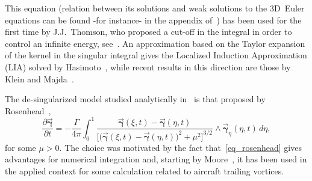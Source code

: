 \documentclass[a4paper,11pt]{article}
\numberwithin{equation}{section}
\newcommand{\bgamma}{\mbox{$\vec{\boldsymbol \gamma}$}}
\begin{document}
This equation (relation between its solutions and weak solutions to
the 3D~Euler equations can be found -for instance- in the appendix
of~\cite{bb}) has been used for the first time by J.J.~Thomson, who
proposed a cut-off in the integral in order to control an infinite
energy, see~\cite{s}. An approximation based on the Taylor expansion
of the kernel in the singular integral gives the Localized Induction
Approximation (LIA) solved by Hasimoto~\cite{h}, while recent results
in this direction are those by Klein and
Majda~\cite{MR92d:7602,MR92m:76038}. \par 
%
The de-singularized model studied analytically in~\cite{bb} is that
proposed by Rosenhead~\cite{Rosenhead},
\begin{equation}\label{eq_rosenhead}
  \frac{\partial\bgamma}{\partial t}=-\frac{\Gamma}{4\pi}
\int_0^1{\frac{\bgamma(\xi,t)-\bgamma(\eta,t)}{\big[\big(\bgamma(\xi,t)-
\bgamma(\eta,t)\big)^2+\mu^2\big]^{3/2}}
\wedge\bgamma_\eta(\eta,t)}\,d\eta,
\end{equation}
for some $\mu>0.$ The choice was motivated by the fact
that~\eqref{eq_rosenhead} gives advantages for numerical integration
and, starting by Moore~\cite{Moore}, it has been used in the applied
context  for some calculation related to aircraft trailing vortices.  
\end{document}
